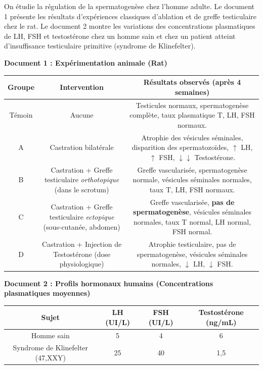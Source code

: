 \documentclass[11pt]{article}
\begin{document}
\begin{exercice}
On étudie la régulation de la spermatogenèse chez l'homme adulte. Le document 1 présente les résultats d'expériences classiques d'ablation et de greffe testiculaire chez le rat. Le document 2 montre les variations des concentrations plasmatiques de LH, FSH et testostérone chez un homme sain et chez un patient atteint d'insuffisance testiculaire primitive (syndrome de Klinefelter).

\begin{center}
\textbf{Document 1 : Expérimentation animale (Rat)}
\begin{tabular}{|c|c|c|}
\hline
\textbf{Groupe} & \textbf{Intervention} & \textbf{Résultats observés (après 4 semaines)} \\
\hline
Témoin & Aucune & Testicules normaux, spermatogenèse complète, taux plasmatique T, LH, FSH normaux. \\
\hline
A & Castration bilatérale & Atrophie des vésicules séminales, disparition des spermatozoïdes, $\uparrow$ LH, $\uparrow$ FSH, $\downarrow\downarrow$ Testostérone. \\
\hline
B & Castration + Greffe testiculaire \textit{orthotopique} (dans le scrotum) & Greffe vascularisée, spermatogenèse normale, vésicules séminales normales, taux T, LH, FSH normaux. \\
\hline
C & Castration + Greffe testiculaire \textit{ectopique} (sous-cutanée, abdomen) & Greffe vascularisée, \textbf{pas de spermatogenèse}, vésicules séminales normales, taux T normal, LH normal, FSH normal. \\
\hline
D & Castration + Injection de Testostérone (dose physiologique) & Atrophie testiculaire, pas de spermatogenèse, vésicules séminales normales, $\downarrow$ LH, $\downarrow$ FSH. \\
\hline
\end{tabular}
\end{center}

\begin{center}
\textbf{Document 2 : Profils hormonaux humains (Concentrations plasmatiques moyennes)}
\begin{tabular}{|c|c|c|c|}
\hline
\textbf{Sujet} & \textbf{LH (UI/L)} & \textbf{FSH (UI/L)} & \textbf{Testostérone (ng/mL)} \\
\hline
Homme sain & 5 & 4 & 6 \\
\hline
Syndrome de Klinefelter (47,XXY) & 25 & 40 & 1,5 \\
\hline
\end{tabular}
\end{center}


\end{exercice}
\end{document}
